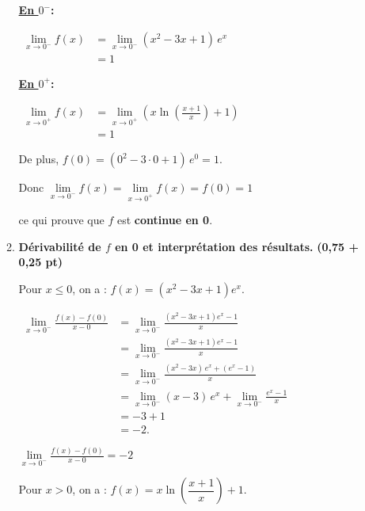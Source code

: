 \documentclass[12pt,a4paper]{article}
\begin{document}
\begin{enumerate}
\begin{enumerate}
        \textbf{\underline{En $0^-$}:}
        
        \(
        \begin{aligned}
            \lim\limits_{x \to 0^-} f(x) &= \lim\limits_{x \to 0^-} (x^2 - 3x + 1)\, e^x\\
            &= 1
        \end{aligned}
        \)

        \textbf{\underline{En $0^+$}:}
        
        \(
            \begin{aligned}
                \lim\limits_{x \to 0^+} f(x) &= \lim\limits_{x \to 0^+} \left( x \ln\left( \frac{x+1}{x} \right) + 1 \right)\\
                &= 1
            \end{aligned}
        \)
        
        De plus, \(f(0) = (0^2 - 3 \cdot 0 + 1)\, e^0 = 1.\)
        
        Donc \( \lim\limits_{x \to 0^-} f(x) = \lim\limits_{x \to 0^+} f(x) = f(0) = 1\)
        
        ce qui prouve que \( f \) est \textbf{continue en 0}.

        \item \textbf{Dérivabilité de \( f \) en 0 et interprétation des résultats.} \hfill \textbf{(0,75 + 0,25 pt)}

        Pour \( x \leq 0 \), on a : \( f(x) = (x^2 - 3x + 1) e^x. \)
        
        \( 
        \begin{aligned}
            \lim\limits_{x \to 0^-}\frac{f(x)-f(0)}{x-0} &= \lim\limits_{x \to 0^-}\frac{(x^2 - 3x + 1) e^x-1}{x}\\
            &= \lim\limits_{x \to 0^-}\frac{(x^2 - 3x + 1) e^x-1}{x}\\
            &= \lim\limits_{x \to 0^-} \frac{(x^2 - 3x)\, e^x + (e^x - 1)}{x} \\
            &= \lim\limits_{x \to 0^-} (x - 3)\, e^x + \lim\limits_{x \to 0^-} \frac{e^x - 1}{x} \\
            &= -3 + 1 \\
            &= -2.
        \end{aligned}
        \)

    \(\lim\limits_{x \to 0^-}\frac{f(x)-f(0)}{x-0}=-2\)

        Pour \( x > 0 \), on a : \(f(x) = x \ln\left( \dfrac{x+1}{x} \right) + 1.\)


\end{enumerate}
\end{enumerate}
\end{document}
